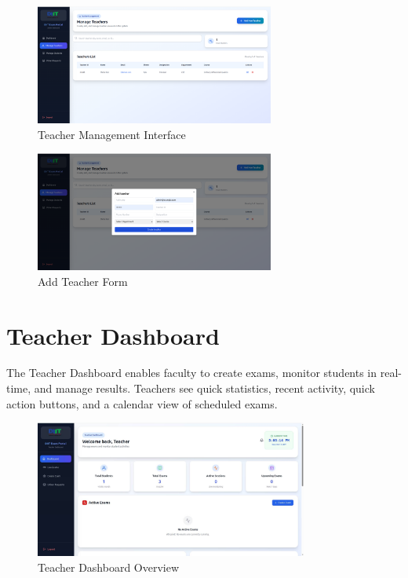 \begin{figure}[p]
    \centering
    \includegraphics[width=0.7\textwidth]{Chap4/admin_teacher_management.png}
    \caption{Teacher Management Interface}
    \label{fig:admin_teachers}
\end{figure}

\begin{figure}[p]
    \centering
    \includegraphics[width=0.7\textwidth]{Chap4/admin_add_teacher.png}
    \caption{Add Teacher Form}
    \label{fig:admin_add_teacher}
\end{figure}

\section{Teacher Dashboard}

The Teacher Dashboard enables faculty to create exams, monitor students in real-time, and manage results. Teachers see quick statistics, recent activity, quick action buttons, and a calendar view of scheduled exams.

\begin{figure}[p]
    \centering
    \includegraphics[width=0.8\textwidth]{Chap4/teacher_dashboard_overview.jpg}
    \caption{Teacher Dashboard Overview}
    \label{fig:teacher_dashboard}
\end{figure}

